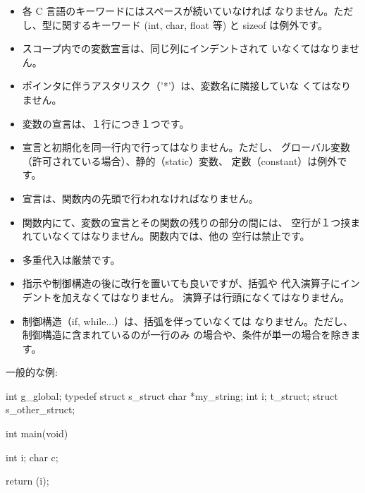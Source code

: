 \documentclass{42-ja}
\begin{document}
\begin{itemize}
                \item 各 C 言語のキーワードにはスペースが続いていなければ
					なりません。ただし、型に関するキーワード (int, char,
					float 等) と sizeof は例外です。

                \item スコープ内での変数宣言は、同じ列にインデントされて
					いなくてはなりません。

                \item ポインタに伴うアスタリスク（'*'）は、変数名に隣接していな
					くてはなりません。

                \item 変数の宣言は、１行につき１つです。

                \item 宣言と初期化を同一行内で行ってはなりません。ただし、
					グローバル変数（許可されている場合）、静的（static）変数、
					定数（constant）は例外です。

                \item 宣言は、関数内の先頭で行われなければなりません。

                \item 関数内にて、変数の宣言とその関数の残りの部分の間には、
					空行が１つ挟まれていなくてはなりません。関数内では、他の
					空行は禁止です。

                \item 多重代入は厳禁です。

                \item 指示や制御構造の後に改行を置いても良いですが、括弧や
					代入演算子にインデントを加えなくてはなりません。
					演算子は行頭になくてはなりません。

                \item 制御構造（if, while...）は、括弧を伴っていなくては
					なりません。ただし、制御構造に含まれているのが一行のみ
					の場合や、条件が単一の場合を除きます。

            \end{itemize}

            \newpage

            一般的な例:
            \begin{42ccode}
int             g_global;
typedef struct  s_struct
{
    char    *my_string;
    int     i;
}               t_struct;
struct          s_other_struct;

int     main(void)
{
    int     i;
    char    c;

    return (i);
}
            \end{42ccode}
            \newpage
\end{document}
